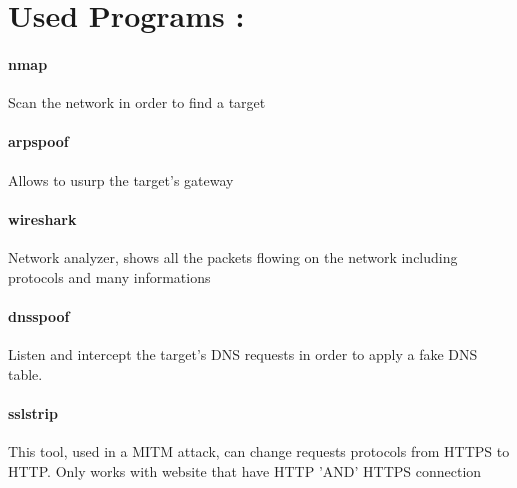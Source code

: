 \documentclass[a4paper, 11pt, oneside]{article}
\begin{document}
\section*{Used Programs :}
\paragraph{nmap}
Scan the network in order to find a target\\

\paragraph{arpspoof}
Allows to usurp the target's gateway\\

\paragraph{wireshark}
Network analyzer, shows all the packets flowing on the network including protocols and many informations\\

\paragraph{dnsspoof}
Listen and intercept the target's DNS requests in order to apply a fake DNS table.\\

\paragraph{sslstrip}
This tool, used in a MITM attack, can change requests protocols from HTTPS to HTTP. Only works with website that have HTTP 'AND' HTTPS connection\\
\end{document}
